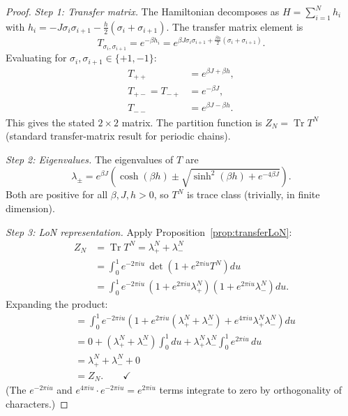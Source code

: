 \documentclass[12pt]{article}
\theoremstyle{plain}
\theoremstyle{definition}
\numberwithin{equation}{section}
\DeclareMathOperator{\Tr}{Tr}
\begin{document}
\begin{proof}
\emph{Step 1: Transfer matrix.}
The Hamiltonian decomposes as $H=\sum_{i=1}^N h_i$ with
$h_i=-J\sigma_i\sigma_{i+1}-\frac{h}{2}(\sigma_i+\sigma_{i+1})$.
The transfer matrix element is
\begin{equation}
T_{\sigma_i,\sigma_{i+1}}
= e^{-\beta h_i}
= e^{\beta J\sigma_i\sigma_{i+1}+\frac{\beta h}{2}(\sigma_i+\sigma_{i+1})}.
\end{equation}
Evaluating for $\sigma_i,\sigma_{i+1}\in\{+1,-1\}$:
\begin{align}
T_{++} &= e^{\beta J+\beta h},\\
T_{+-} = T_{-+} &= e^{-\beta J},\\
T_{--} &= e^{\beta J-\beta h}.
\end{align}
This gives the stated $2\times 2$ matrix.  The partition function is
$Z_N=\Tr T^N$ (standard transfer-matrix result for periodic chains).

\emph{Step 2: Eigenvalues.}
The eigenvalues of $T$ are
\begin{equation}
\lambda_\pm = e^{\beta J}\!\left(\cosh(\beta h)
\pm\sqrt{\sinh^2(\beta h)+e^{-4\beta J}}\right).
\end{equation}
Both are positive for all $\beta,J,h>0$, so $T^N$ is trace class
(trivially, in finite dimension).

\emph{Step 3: LoN representation.}
Apply Proposition~\ref{prop:transferLoN}:
\begin{align}
Z_N &= \Tr T^N = \lambda_+^N+\lambda_-^N\\
&= \int_0^1 e^{-2\pi iu}\,
\det\!\left(1+e^{2\pi iu}T^N\right)du\\
&= \int_0^1 e^{-2\pi iu}\,
\left(1+e^{2\pi iu}\lambda_+^N\right)
\left(1+e^{2\pi iu}\lambda_-^N\right)du.
\end{align}
Expanding the product:
\begin{align}
&= \int_0^1 e^{-2\pi iu}\!\left(1
+e^{2\pi iu}(\lambda_+^N+\lambda_-^N)
+e^{4\pi iu}\lambda_+^N\lambda_-^N\right)du\\
&= 0 + (\lambda_+^N+\lambda_-^N)\int_0^1 du
+ \lambda_+^N\lambda_-^N\int_0^1 e^{2\pi iu}\,du\\
&= \lambda_+^N+\lambda_-^N + 0\\
&= Z_N.\qquad\checkmark
\end{align}
(The $e^{-2\pi iu}$ and $e^{4\pi iu}\cdot e^{-2\pi iu}=e^{2\pi iu}$
terms integrate to zero by orthogonality of characters.)
\end{proof}
\end{document}

